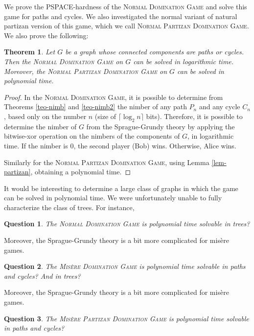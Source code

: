 \documentclass[12pt]{article}
\newtheorem{question}{Question}
\newtheorem{theorem}{Theorem}[section]
\begin{document}
We prove the PSPACE-hardness of the \textsc{Normal Domination Game} and solve this game for paths and cycles.
We also investigated the normal variant of natural partizan version of this game, which we call \textsc{Normal Partizan Domination Game}.
We also prove the following:

\begin{theorem}
Let $G$ be a graph whose connected components are paths or cycles.
Then the \textsc{Normal Domination Game} on $G$ can be solved in logarithmic time.
Moreover, the \textsc{Normal Partizan Domination Game} on $G$ can be solved in polynomial time.
\end{theorem}

\begin{proof}
In the \textsc{Normal Domination Game}, it is possible to determine from Theorems \ref{teo-nimb} and \ref{teo-nimb2} the nimber of any path $P_n$ and any cycle $C_n$, based only on the number $n$ (size of $\lceil\log_2 n\rceil$ bits). Therefore, it is possible to determine the nimber of $G$ from the Sprague-Grundy theory by applying the bitwise-xor operation on the nimbers of the components of $G$, in logarithmic time.
If the nimber is $0$, the second player (Bob) wins. Otherwise, Alice wins.

Similarly for the \textsc{Normal Partizan Domination Game}, using Lemma \ref{lem-partizan}, obtaining a polynomial time.
\end{proof}

It would be interesting to determine a large class of graphs in which the game can be solved in polynomial time.
We were unfortunately unable to fully characterize the class of trees. For instance, 

\begin{question}
The \textsc{Normal Domination Game} is polynomial time solvable in trees?
\end{question}

Moreover, the Sprague-Grundy theory is a bit more complicated for misère games.

\begin{question}
The \textsc{Misère Domination Game} is polynomial time solvable in paths and cycles? And in trees?
\end{question}

Moreover, the Sprague-Grundy theory is a bit more complicated for misère games.

\begin{question}
The \textsc{Misère Partizan Domination Game} is polynomial time solvable in paths and cycles?
\end{question}
\end{document}
